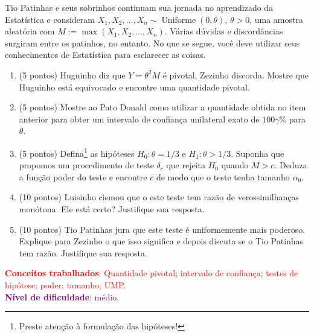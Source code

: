 \documentclass[a4paper,10pt, notitlepage]{report}
\newcommand{\rs}{X_1, X_2, \ldots, X_n} %
\begin{document}
Tio Patinhas e seus sobrinhos continuam sua jornada no aprendizado da Estatística e  consideram  $\rs \sim \operatorname{Uniforme}(0, \theta)$, $\theta > 0$, uma amostra aleatória com $M := \max(\rs)$.
Várias dúvidas e discordâncias surgiram entre os patinhos, no entanto. 
No que se segue, você deve utilizar seus conhecimentos de Estatística para esclarecer as coisas.


\begin{enumerate}[label=\alph*)]
\item (5 pontos) Huguinho diz que $Y = \theta^2 M$ é pivotal, Zezinho discorda.
Mostre que Huguinho está equivocado e encontre uma quantidade pivotal.
 \item (5 pontos) Mostre ao Pato Donald como utilizar a quantidade obtida no item anterior para obter um intervalo de confiança unilateral exato de $100\gamma \%$ para $\theta$. 
 \item (5 pontos) Defina\footnote{Preste atenção à formulação das hipóteses!} as hipóteses $H_0: \theta = 1/3$ e $H_1: \theta > 1/3$. 
Suponha que propomos um  procedimento de teste $\delta_c$ que rejeita $H_0$ quando $M > c$.
Deduza a função poder do teste e encontre $c$ de modo que o teste tenha tamanho $\alpha_0$.
 \item (10 pontos) Luisinho cismou que o  este teste tem razão de verossimilhanças monótona. 
 Ele está certo?
 Justifique sua resposta.
  \item (10 pontos) Tio Patinhas jura que este teste é uniformemente mais poderoso.
  Explique para Zezinho o que isso significa e depois discuta se o Tio Patinhas tem razão.
  Justifique sua resposta.
\end{enumerate}
\textcolor{red}{\textbf{Conceitos trabalhados}: Quantidade pivotal; intervalo de confiança; testes de hipótese; poder; tamanho; UMP.}\\ \textcolor{purple}{\textbf{Nível de dificuldade}: médio.}\\
\end{document}
